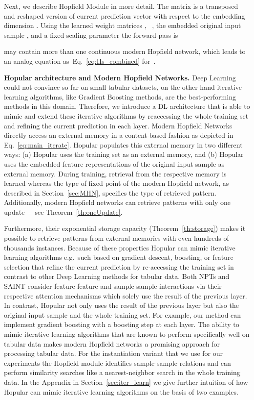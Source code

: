 \documentclass{article}
\theoremstyle{plain}
\theoremstyle{definition}
\theoremstyle{remark}
\begin{document}
Next, we describe Hopfield Module  in more detail.
The matrix  is a transposed and reshaped version 
of current prediction vector  with respect to the embedding dimension .
Using the learned weight matrices ,  \
, 
the embedded original input sample , and a fixed scaling parameter 
the forward-pass is

 may contain more than one continuous modern Hopfield network,
which leads to an analog equation as~Eq.~\eqref{eq:Hs_combined} for~.

{\bf Hopular architecture and Modern Hopfield Networks.}
Deep Learning could not convince so far on small tabular datasets, 
on the other hand iterative learning algorithms, 
like Gradient Boosting methods, are the best-performing methods in this domain. 
Therefore, we introduce a DL architecture that is able to mimic and 
extend these iterative algorithms by reaccessing the whole training set and 
refining the current prediction in each layer. 
Modern Hopfield Networks directly access an external memory
in a content-based fashion as depicted in Eq.~\eqref{eq:main_iterate}.
Hopular populates this external memory in two different ways: (a) Hopular uses the training set as an external memory, and (b) Hopular uses the embedded feature representations of the original input sample as external memory.
During training, retrieval from the respective memory is learned whereas
the type of fixed point of the modern Hopfield network, 
as described in Section~\ref{sec:MHN}, specifies the type of retrieved pattern.
Additionally, modern Hopfield networks
can retrieve patterns with only one update~\---{}~see Theorem~\ref{th:oneUpdate}.

Furthermore, their exponential storage capacity (Theorem~\ref{th:storage}) makes it possible to
retrieve patterns from external memories with even hundreds of thousands
instances.
Because of these properties Hopular can mimic iterative learning algorithms e.g.\ such based on gradient descent, boosting, or feature selection that refine the current prediction by re-accessing the training set in contrast to other Deep Learning methods for tabular data. Both NPTs and SAINT consider feature-feature and sample-sample interactions via their respective attention mechanisms which solely use the result of the previous layer. In contrast, Hopular not only uses the result of the previous layer but also the original input sample and the whole training set.
For example, our method can implement gradient boosting with a boosting step at each layer.
The ability to mimic iterative learning algorithms that are known to perform specifically well on tabular data makes modern Hopfield networks a promising
approach for processing tabular data.
For the instantiation variant that we use for our experiments
the Hopfield module  identifies sample-sample relations
and can perform similarity searches like a nearest-neighbor search 
in the whole training data.
In the Appendix in Section~\ref{sec:iter_learn}
we give further intuition of how Hopular
can mimic iterative learning algorithms on the basis of two examples.
\end{document}
